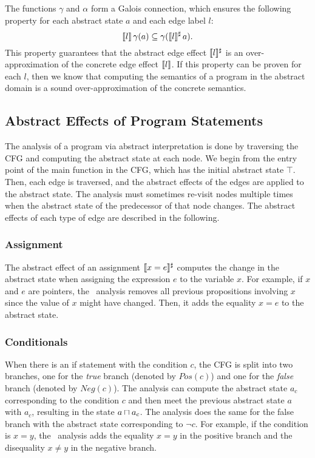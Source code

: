 The functions $\gamma$ and $\alpha$ form a Galois connection, which ensures the following property for each abstract state $a$ and each edge label $l$:
\[
  \llbracket l\rrbracket\,\gamma(a) \subseteq \gamma(\llbracket l\rrbracket^\sharp\,a).
\]
This property guarantees that the abstract edge effect $\llbracket l\rrbracket^\sharp$ is an over-approximation
of the concrete edge effect $\llbracket l\rrbracket$.
If this property can be proven for each $l$, then we know that computing the semantics of a program in the abstract domain is a sound over-approximation of the concrete semantics.

\subsection{Abstract Effects of Program Statements}
The analysis of a program via abstract interpretation is done by traversing the CFG and computing the abstract state at each node.
We begin from the entry point of the \textsf{main} function in the CFG, which has the initial abstract state $\top$.
Then, each edge is traversed, and the abstract effects of the edges are applied to the abstract state.
The analysis must sometimes re-visit nodes multiple times when the abstract state of the predecessor of that node changes.
The abstract effects of each type of edge are described in the following.

\subsubsection{Assignment}
The abstract effect of an assignment $\llbracket x = e\rrbracket^\sharp$ computes the change in the abstract state when assigning the expression $e$ to the variable $x$.
For example, if $x$ and $e$ are pointers, the \cpo\ analysis removes all previous propositions involving $x$ since the value of $x$ might have changed.
Then, it adds the equality $x = e$ to the abstract state.
\subsubsection{Conditionals}
When there is an \textsf{if} statement with the condition $c$, the CFG is split into two branches, one for the \emph{true} branch (denoted by $Pos(c)$) and one for the \emph{false} branch (denoted by $Neg(c)$).
The analysis can compute the abstract state $a_c$ corresponding to the condition $c$ and then meet the previous abstract state $a$ with $a_c$, resulting in the state $a \sqcap a_c$.
The analysis does the same for the false branch with the abstract state corresponding to $\neg c$.
For example, if the condition is $x = y$, the \cpo\ analysis adds the equality $x = y$ in the positive branch and the disequality $x \neq y$ in the negative branch.
